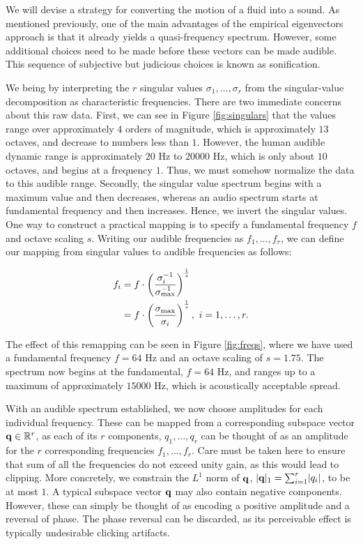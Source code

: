 \documentclass[11pt]{article}
\begin{document}
We will devise a strategy for converting the motion of a fluid into a sound. As mentioned previously, one of the main advantages of the empirical eigenvectors approach is that it already yields a quasi-frequency spectrum. However, some additional choices need to be made before these vectors can be made audible. This sequence of subjective but judicious choices is known as sonification.

We being by interpreting the $r$ singular values $\sigma_1, \ldots, \sigma_r$ from the singular-value decomposition as characteristic frequencies. There are two immediate concerns about this raw data. First, we can see in Figure \ref{fig:singulars} that the values range over approximately $4$ orders of magnitude, which is approximately $13$ octaves, and decrease to numbers less than $1$. However, the human audible dynamic range is approximately $20$ Hz to $20000$ Hz, which is only about $10$ octaves, and begins at a frequency $1$. Thus, we must somehow normalize the data to this audible range. Secondly, the singular value spectrum begins with a maximum value and then decreases, whereas an audio spectrum starts at fundamental frequency and then increases. Hence, we invert the singular values. One way to construct a practical mapping is to specify a fundamental frequency $f$ and octave scaling $s$. Writing our audible frequencies as $f_1, \ldots, f_r$, we can define our mapping from singular values to audible frequencies as follows:

\begin{equation} 
\begin{aligned}
f_i &= f \cdot \left(\frac{\sigma_{i}^{-1}}{\sigma_{\textnormal{max}}^{-1}}\right)^{\frac{1}{s}} \\
&= f \cdot \left(\frac{\sigma_{\textnormal{max}}}{\sigma_i}\right)^{\frac{1}{s}}, \ i = 1, \ldots, r.
\end{aligned}
\end{equation}

The effect of this remapping can be seen in Figure \ref{fig:freqs}, where we have used a fundamental frequency $f = 64$ Hz and an octave scaling of $s = 1.75$. The spectrum now begins at the fundamental, $f = 64$ Hz, and ranges up to a maximum of approximately $15000$ Hz, which is acoustically acceptable spread.

With an audible spectrum established, we now choose amplitudes for each individual frequency. These can be mapped from a corresponding subspace vector $\mathbf{q} \in \mathbb{R}^r$, as each of its $r$ components, $q_1, \ldots, q_r$ can be thought of as an amplitude for the $r$ corresponding frequencies $f_1, \ldots, f_r$. Care must be taken here to ensure that sum of all the frequencies do not exceed unity gain, as this would lead to clipping. More concretely, we constrain the $L^1$ norm of $\mathbf{q}$, $\lvert\mathbf{q}\rvert_1 = \sum_{i=1}^{r}\lvert q_i \rvert$, to be at most $1$. A typical subspace vector $\mathbf{q}$ may also contain negative components. However, these can simply be thought of as encoding a positive amplitude and a reversal of phase. The phase reversal can be discarded, as its perceivable effect is typically undesirable clicking artifacts.
\end{document}
